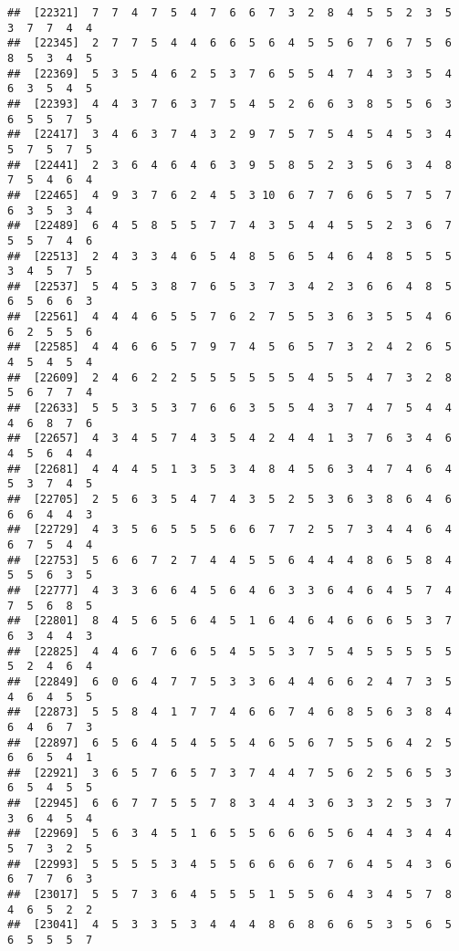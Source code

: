 \documentclass[
]{book}
\begin{document}
\begin{verbatim}
##  [22321]  7  7  4  7  5  4  7  6  6  7  3  2  8  4  5  5  2  3  5  3  7  7  4  4
##  [22345]  2  7  7  5  4  4  6  6  5  6  4  5  5  6  7  6  7  5  6  8  5  3  4  5
##  [22369]  5  3  5  4  6  2  5  3  7  6  5  5  4  7  4  3  3  5  4  6  3  5  4  5
##  [22393]  4  4  3  7  6  3  7  5  4  5  2  6  6  3  8  5  5  6  3  6  5  5  7  5
##  [22417]  3  4  6  3  7  4  3  2  9  7  5  7  5  4  5  4  5  3  4  5  7  5  7  5
##  [22441]  2  3  6  4  6  4  6  3  9  5  8  5  2  3  5  6  3  4  8  7  5  4  6  4
##  [22465]  4  9  3  7  6  2  4  5  3 10  6  7  7  6  6  5  7  5  7  6  3  5  3  4
##  [22489]  6  4  5  8  5  5  7  7  4  3  5  4  4  5  5  2  3  6  7  5  5  7  4  6
##  [22513]  2  4  3  3  4  6  5  4  8  5  6  5  4  6  4  8  5  5  5  3  4  5  7  5
##  [22537]  5  4  5  3  8  7  6  5  3  7  3  4  2  3  6  6  4  8  5  6  5  6  6  3
##  [22561]  4  4  4  6  5  5  7  6  2  7  5  5  3  6  3  5  5  4  6  6  2  5  5  6
##  [22585]  4  4  6  6  5  7  9  7  4  5  6  5  7  3  2  4  2  6  5  4  5  4  5  4
##  [22609]  2  4  6  2  2  5  5  5  5  5  5  4  5  5  4  7  3  2  8  5  6  7  7  4
##  [22633]  5  5  3  5  3  7  6  6  3  5  5  4  3  7  4  7  5  4  4  4  6  8  7  6
##  [22657]  4  3  4  5  7  4  3  5  4  2  4  4  1  3  7  6  3  4  6  4  5  6  4  4
##  [22681]  4  4  4  5  1  3  5  3  4  8  4  5  6  3  4  7  4  6  4  5  3  7  4  5
##  [22705]  2  5  6  3  5  4  7  4  3  5  2  5  3  6  3  8  6  4  6  6  6  4  4  3
##  [22729]  4  3  5  6  5  5  5  6  6  7  7  2  5  7  3  4  4  6  4  6  7  5  4  4
##  [22753]  5  6  6  7  2  7  4  4  5  5  6  4  4  4  8  6  5  8  4  5  5  6  3  5
##  [22777]  4  3  3  6  6  4  5  6  4  6  3  3  6  4  6  4  5  7  4  7  5  6  8  5
##  [22801]  8  4  5  6  5  6  4  5  1  6  4  6  4  6  6  6  5  3  7  6  3  4  4  3
##  [22825]  4  4  6  7  6  6  5  4  5  5  3  7  5  4  5  5  5  5  5  5  2  4  6  4
##  [22849]  6  0  6  4  7  7  5  3  3  6  4  4  6  6  2  4  7  3  5  4  6  4  5  5
##  [22873]  5  5  8  4  1  7  7  4  6  6  7  4  6  8  5  6  3  8  4  6  4  6  7  3
##  [22897]  6  5  6  4  5  4  5  5  4  6  5  6  7  5  5  6  4  2  5  6  6  5  4  1
##  [22921]  3  6  5  7  6  5  7  3  7  4  4  7  5  6  2  5  6  5  3  6  5  4  5  5
##  [22945]  6  6  7  7  5  5  7  8  3  4  4  3  6  3  3  2  5  3  7  3  6  4  5  4
##  [22969]  5  6  3  4  5  1  6  5  5  6  6  6  5  6  4  4  3  4  4  5  7  3  2  5
##  [22993]  5  5  5  5  3  4  5  5  6  6  6  6  7  6  4  5  4  3  6  6  7  7  6  3
##  [23017]  5  5  7  3  6  4  5  5  5  1  5  5  6  4  3  4  5  7  8  4  6  5  2  2
##  [23041]  4  5  3  3  5  3  4  4  4  8  6  8  6  6  5  3  5  6  5  6  5  5  5  7

\end{verbatim}
\end{document}
